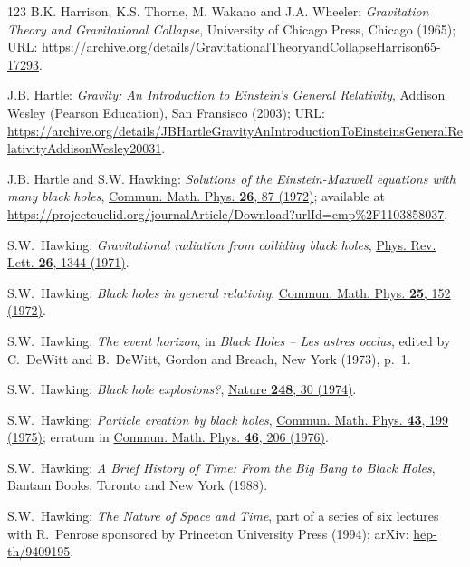 \begin{thebibliography}{123}
B.K. Harrison, K.S. Thorne, M. Wakano and J.A. Wheeler:
{\em Gravitation Theory and Gravitational Collapse},
University of Chicago Press, Chicago (1965);
URL: {\footnotesize\url{https://archive.org/details/GravitationalTheoryandCollapseHarrison65-17293}}.

J.B. Hartle: \emph{Gravity: An Introduction to Einstein's General Relativity},
Addison Wesley (Pearson Education), San Fransisco (2003);
URL: {\footnotesize\url{https://archive.org/details/JBHartleGravityAnIntroductionToEinsteinsGeneralRelativityAddisonWesley20031}}.

J.B. Hartle and S.W. Hawking:
{\em Solutions of the Einstein-Maxwell equations with many black holes},
\href{https://doi.org/10.1007/BF01645696}{Commun. Math. Phys. {\bf 26}, 87 (1972)};
available at {\footnotesize\url{https://projecteuclid.org/journalArticle/Download?urlId=cmp%2F1103858037}}.

S.W.~Hawking:
{\em Gravitational radiation from colliding black holes},
\href{https://doi.org/10.1103/PhysRevLett.26.1344}{Phys. Rev. Lett. {\bf 26}, 1344 (1971)}.

S.W.~Hawking:
{\em Black holes in general relativity},
\href{https://doi.org/10.1007/BF01877517}{Commun. Math. Phys. {\bf 25}, 152 (1972)}.

S.W.~Hawking:
{\em The event horizon},
in {\em Black Holes -- Les astres occlus}, edited by C.~DeWitt and B.~DeWitt,
Gordon and Breach, New York (1973), p.~1.

S.W.~Hawking: {\em Black hole explosions?},
\href{https://doi.org/10.1038/248030a0}{Nature {\bf 248}, 30 (1974)}.

S.W.~Hawking:
{\em Particle creation by black holes},
\href{https://doi.org/10.1007/BF02345020}{Commun. Math. Phys. {\bf 43}, 199 (1975)}; erratum
in \href{https://doi.org/10.1007/BF01608497}{Commun. Math. Phys. {\bf 46}, 206 (1976)}.

S.W.~Hawking:
{\em A Brief History of Time: From the Big Bang to Black Holes},
Bantam Books, Toronto and New York (1988).

S.W.~Hawking:
{\em The Nature of Space and Time}, part of a series of six lectures with
R.~Penrose sponsored by Princeton University Press (1994);
arXiv: \href{https://arxiv.org/abs/hep-th/9409195}{hep-th/9409195}.


\end{thebibliography}
